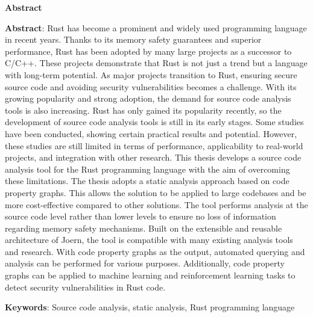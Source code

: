 \begin{center}
\textbf{\large{Abstract}}
\end{center}

\begin{small}

\textbf{Abstract}:
Rust has become a prominent and widely used programming language in recent years.
Thanks to its memory safety guarantees and superior performance, Rust has been adopted by many large projects as a successor to C/C++.
These projects demonstrate that Rust is not just a trend but a language with long-term potential.
As major projects transition to Rust, ensuring secure source code and avoiding security vulnerabilities becomes a challenge.
With its growing popularity and strong adoption, the demand for source code analysis tools is also increasing.
Rust has only gained its popularity recently, so the development of source code analysis tools is still in its early stages.
Some studies have been conducted, showing certain practical results and potential.
However, these studies are still limited in terms of performance, applicability to real-world projects, and integration with other research.
This thesis develops a source code analysis tool for the Rust programming language with the aim of overcoming these limitations.
The thesis adopts a static analysis approach based on code property graphs.
This allows the solution to be applied to large codebases and be more cost-effective compared to other solutions.
The tool performs analysis at the source code level rather than lower levels to ensure no loss of information regarding memory safety mechanisms.
Built on the extensible and reusable architecture of Joern, the tool is compatible with many existing analysis tools and research.
With code property graphs as the output, automated querying and analysis can be performed for various purposes.
Additionally, code property graphs can be applied to machine learning and reinforcement learning tasks to detect security vulnerabilities in Rust code.

\vspace*{1cm}
\textbf{Keywords}: Source code analysis, static analysis, Rust programming language
\end{small}